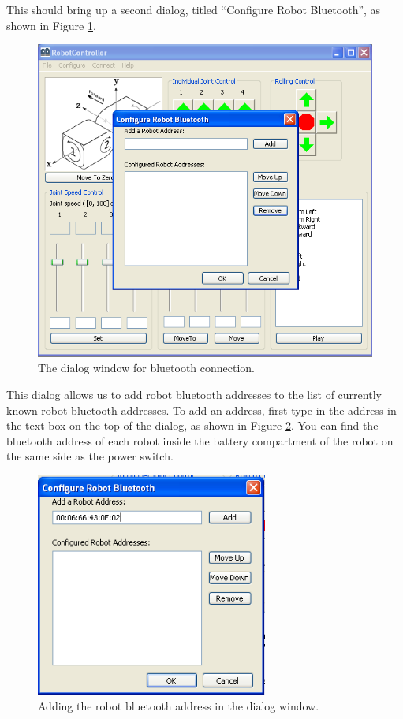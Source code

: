 \documentclass{article}
\begin{document}
This should bring up a second dialog, titled ``Configure Robot Bluetooth'', as
shown in Figure \ref{fig:shot4.png}.

\begin{figure}[H]
\begin{center}
\includegraphics[width=4.5in]{images/shot4.png}
\end{center}
\caption{\label{fig:shot4.png} The dialog window for bluetooth connection.}
\end{figure}

This dialog allows us to add robot bluetooth addresses to the list of currently
known robot bluetooth addresses. To add an address, first type in the address
in the text box on the top of the dialog, as shown in Figure \ref{fig:shot5.png}.
You can find the bluetooth address of each robot inside the battery compartment
of the robot on the same side as the power switch. 

\begin{figure}[H]
\begin{center}
\includegraphics[width=3in]{images/shot5.png}
\end{center}
\caption{\label{fig:shot5.png} Adding the robot bluetooth address in the dialog window.}
\end{figure}
\end{document}
